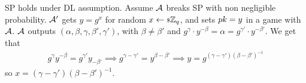 \ac{SP} holds under \ac{DL} assumption.
Assume $\mathcal{A}$ breaks \ac{SP} with non negligible probability.
$\mathcal{A}'$ gets $y = g^x$ for random $x \leftarrow {\scriptstyle \$} {\mathbb{Z}_q}$, and sets $pk = y$ in a game with $\mathcal{A}$.
$\mathcal{A}$ outputs $(\alpha, \beta, \gamma, \beta', \gamma')$, with $\beta \neq \beta'$ and $g^{\gamma} \cdot y^{-\beta} = \alpha = g^{\gamma'} \cdot y^{-\beta'}$.
We get that
\begin{align*}
	g^{\gamma} y^{-\beta} = g^{\gamma'} y_{-\beta'}
	\implies
	g^{\gamma - \gamma'} = y^{\beta - \beta'}
	\implies
	y = g^{(\gamma - \gamma')(\beta - \beta')^{-1}}
\end{align*}
so $x = (\gamma - \gamma')(\beta - \beta')^{-1}$.








